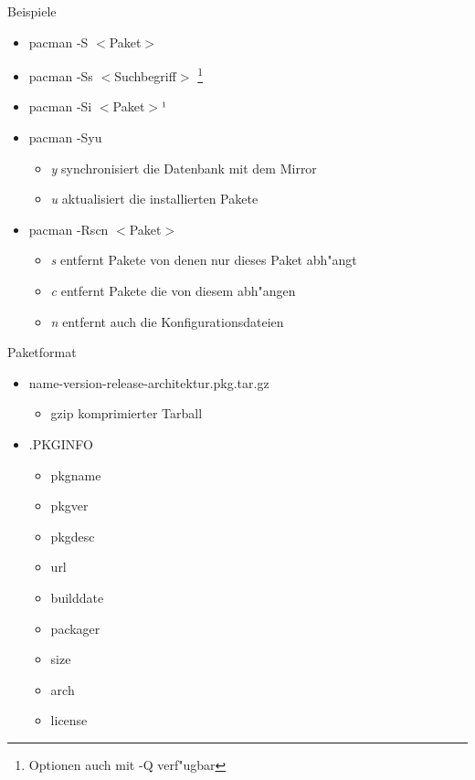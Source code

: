 \begin{slide}{Beispiele}
	\begin{itemize}
		\item{pacman -S $<$Paket$>$}
		\item{pacman -Ss $<$Suchbegriff$>$
			\footnote{Optionen auch mit -Q verf"{u}gbar}
		}
		\item{pacman -Si $<$Paket$>$¹}
		\item{pacman -Syu
			\begin{itemize}
				\item{\textit{y} synchronisiert die Datenbank mit dem Mirror}
				\item{\textit{u} aktualisiert die installierten Pakete}
			\end{itemize}
		}
		\item{pacman -Rscn $<$Paket$>$
			\begin{itemize}
				\item{\textit{s} entfernt Pakete von denen nur dieses Paket
					abh"{a}ngt}
				\item{\textit{c} entfernt Pakete die von diesem abh"{a}ngen}
				\item{\textit{n} entfernt auch die Konfigurationsdateien}
			\end{itemize}
		}
	\end{itemize}
\end{slide}

\begin{slide}{Paketformat}
	\begin{itemize}
		\item{name-version-release-architektur.pkg.tar.gz
			\begin{itemize}
				\item{gzip komprimierter Tarball}
			\end{itemize}
		}
		\item{.PKGINFO
			\begin{itemize}
				\item{pkgname}
				\item{pkgver}
				\item{pkgdesc}
				\item{url}
				\item{builddate}
				\item{packager}
				\item{size}
				\item{arch}
				\item{license}
			\end{itemize}
		}		
	\end{itemize}
\end{slide}

